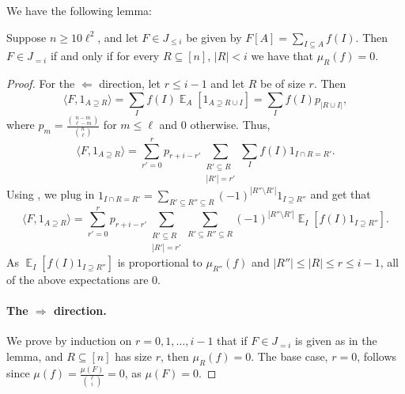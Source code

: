 \documentclass{toc}
\newcommand\card[1]{\left| {#1} \right|}
\newcommand\Expect[2]{{\mathop{\mathbb{E}}_{#1}\left[ {#2} \right]}}
\newcommand\inner[2]{\langle{#1},{#2}\rangle}
\renewcommand\geq{\geqslant}
\renewcommand\leq{\leqslant}
\begin{document}
We have the following lemma:
\begin{lemma}\label{lem:purp_cond}
Suppose $n\geq 10\ell^2$, and let $F\in J_{\leq i}$ be given by $F[A] = \sum\limits_{I\subseteq A} f(I)$.
Then $F\in J_{=i}$ if and only if for every $R\subseteq [n]$, $\card{R}<i$ we %
have that $\mu_R (f)=0$.
\end{lemma}
\begin{proof}
For the $\Leftarrow$ direction, let $r\leq i-1$ and let $R$ be of size $r$. Then
\[
\inner{F}{1_{A\supseteq R}}
=\sum\limits_{I}f(I) \Expect{A}{1_{A\supseteq R\cup I}}
=\sum\limits_{I}f(I) p_{\card{R\cup I}},
\]
where $p_{m} = \frac{\binom{n-m}{\ell - m}}{\binom{n}{\ell}}$ for $m\leq \ell$ and $0$ otherwise. Thus,
\[
\inner{F}{1_{A\supseteq R}} = \sum\limits_{r'=0}^{r}p_{r+i-r'}\sum\limits_{\substack{R'\subseteq R\\ \card{R'} = r'}} \sum\limits_{I} f(I)1_{I\cap R = R'}.
\]
Using , we plug in $1_{I\cap R = R'} = \sum\limits_{R'\subseteq R''\subseteq R}(-1)^{\card{R''\setminus R'}} 1_{I\supseteq R''}$
and get that
\[
\inner{F}{1_{A\supseteq R}} =
\sum\limits_{r'=0}^{r}p_{r+i-r'}\sum\limits_{\substack{R'\subseteq R\\ \card{R'} = r'}}
\sum\limits_{R'\subseteq R''\subseteq R} (-1)^{\card{R''\setminus R'}} \Expect{I}{f(I) 1_{I\supseteq R''}}.
\]
As $\Expect{I}{f(I) 1_{I\supseteq R''}}$ is proportional to $\mu_{R''}(f)$ and $\card{R''}\leq \card{R}\leq r\leq i-1$, all of the above expectations are $0$.

\paragraph{The $\Rightarrow$ direction.} We prove by induction on $r=0,1,\ldots,i-1$
that if $F\in J_{=i}$ is given as in the lemma, and $R\subseteq [n]$ has size $r$, then $\mu_R(f) = 0$.
The base case, $r=0$, follows since $\mu(f) = \frac{\mu(F)}{{\ell\choose i}} = 0$, as $\mu(F) = 0$.


\end{proof}
\end{document}
